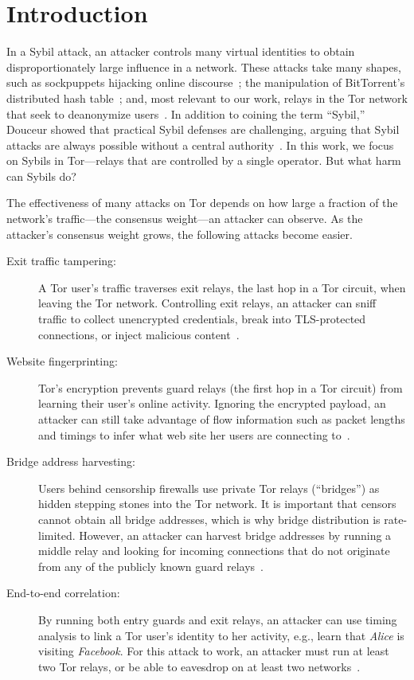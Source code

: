 \section{Introduction}
\label{sec:introduction}
In a Sybil attack, an attacker controls many virtual identities to obtain
disproportionately large influence in a network.  These attacks take many
shapes, such as sockpuppets hijacking online discourse~\cite{Thomas2012a}; the
manipulation of BitTorrent's distributed hash table~\cite{Wang2012a}; and, most
relevant to our work, relays in the Tor network that seek to deanonymize
users~\cite{cmucert}.  In addition to coining the term ``Sybil,'' Douceur showed
that practical Sybil defenses are challenging, arguing that Sybil attacks are
always possible without a central authority~\cite{Douceur2002a}.  In this work,
we focus on Sybils in Tor---relays that are controlled by a single operator.
But what harm can Sybils do?

The effectiveness of many attacks on Tor depends on how large a fraction of the
network's traffic---the consensus weight---an attacker can observe.  As the
attacker's consensus weight grows, the following attacks become easier.

\begin{description}
	\item[Exit traffic tampering:] A Tor user's traffic traverses exit relays,
		the last hop in a Tor circuit, when leaving the Tor network.
		Controlling exit relays, an attacker can sniff traffic to collect
		unencrypted credentials, break into TLS-protected connections, or inject
		malicious content~\cite{Winter2014a}.
	\item[Website fingerprinting:] Tor's encryption prevents guard relays (the
		first hop in a Tor circuit) from learning their user's online activity.
		Ignoring the encrypted payload, an attacker can still take advantage of
		flow information such as packet lengths and timings to infer what web
		site her users are connecting to~\cite{Juarez2014a}.
	\item[Bridge address harvesting:] Users behind censorship firewalls use
		private Tor relays (``bridges'') as hidden stepping stones into the Tor
		network.  It is important that censors cannot obtain all bridge
		addresses, which is why bridge distribution is rate-limited.  However,
		an attacker can harvest bridge addresses by running a middle relay and
		looking for incoming connections that do not originate from any of the
		publicly known guard relays~\cite{Ling2012a}.
	\item[End-to-end correlation:] By running both entry guards and exit relays,
		an attacker can use timing analysis to link a Tor user's identity to her
		activity, e.g., learn that \emph{Alice} is visiting \emph{Facebook}.
		For this attack to work, an attacker must run at least two Tor relays,
		or be able to eavesdrop on at least two networks~\cite{Johnson2013a}.
\end{description}

